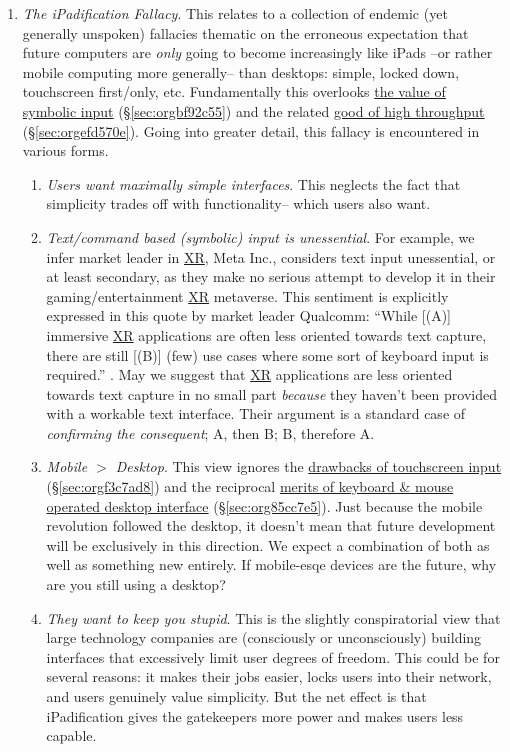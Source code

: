 \documentclass[logo,bsc,singlespacing,parskip]{infthesis}
\begin{document}
\begin{enumerate}
\item \emph{The iPadification Fallacy}.\label{ipadification fallacy}
This relates to a collection of endemic (yet generally unspoken) fallacies thematic on the erroneous expectation that future computers are \emph{only} going to become increasingly like iPads --or rather mobile computing more generally-- than desktops: simple, locked down, touchscreen first/only, etc.
Fundamentally this overlooks \hyperref[sec:orgbf92c55]{the value of symbolic input} (\S \ref{sec:orgbf92c55}) and the related \hyperref[sec:orgefd570e]{good of high throughput} (\S \ref{sec:orgefd570e}).
Going into greater detail, this fallacy is encountered in various forms.
\begin{enumerate}
\item \emph{Users want maximally simple interfaces}.
This neglects the fact that simplicity trades off with functionality-- which users also want.
\item \emph{Text/command based (symbolic) input is unessential}.
For example, we infer market leader in \hyperref[org88b0f70]{XR},  Meta Inc., considers text input unessential, or at least secondary, as they make no serious attempt to develop it in their gaming/entertainment \hyperref[org88b0f70]{XR} metaverse.
This sentiment is explicitly expressed in this quote by market leader Qualcomm: ``While [(A)] immersive \hyperref[org88b0f70]{XR} applications are often less oriented towards text capture, there are still [(B)] (few) use cases where some sort of keyboard input is required.'' \autocite{qualcommXRUserInterfaces}.
May we suggest that \hyperref[org88b0f70]{XR} applications are less oriented towards text capture in no small part \emph{because} they haven't been provided with a workable text interface.
Their argument is a standard case of \emph{confirming the consequent}; A, then B; B, therefore A.
\item \emph{Mobile \(>\) Desktop}.
This view ignores the \hyperref[sec:orgf3c7ad8]{drawbacks of touchscreen input} (\S \ref{sec:orgf3c7ad8}) and the reciprocal \hyperref[sec:org85cc7e5]{merits of keyboard \& mouse operated desktop interface} (\S \ref{sec:org85cc7e5}).
Just because the mobile revolution followed the desktop, it doesn't mean that future development will be exclusively in this direction.
We expect a combination of both as well as something new entirely.
If mobile-esqe devices are the future, why are you still using a desktop?
\item \emph{They want to keep you stupid}.
This is the slightly conspiratorial view that large technology companies are (consciously or unconsciously) building interfaces that excessively limit user degrees of freedom.
This could be for several reasons: it makes their jobs easier, locks users into their network, and users genuinely value simplicity.
But the net effect is that iPadification gives the gatekeepers more power and makes users less capable.
\end{enumerate}


\end{enumerate}
\end{document}
